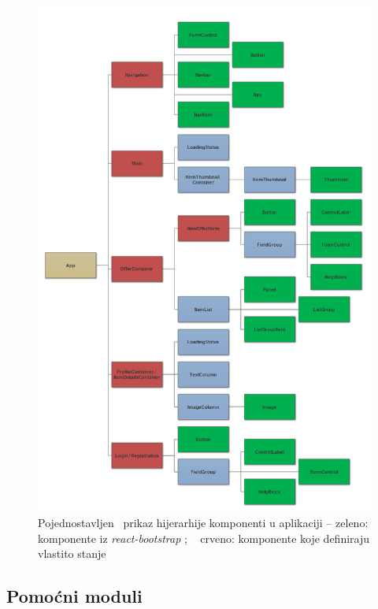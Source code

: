 \documentclass[times, utf8, zavrsni, numeric]{fer}
\begin{document}
\begin{figure}[htb]
\centering
\includegraphics[width=14.5cm]{img/components-tree2.png}
\caption[caption]{Pojednostavljen\footnotemark ~ prikaz hijerarhije komponenti u aplikaciji -- zeleno: komponente iz \emph{react-bootstrap} ; ~ crveno: komponente koje definiraju vlastito stanje}
\label{fig:components-tree}
\end{figure}


\clearpage


\subsection{Pomoćni moduli}
\end{document}
